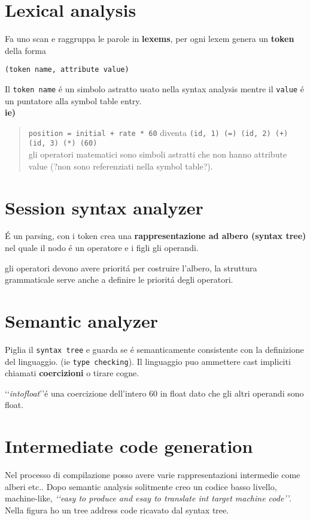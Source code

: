 \section{Lexical analysis}
Fa uno scan e raggruppa le parole in \textbf{lexems}, per ogni lexem genera un \textbf{token} della forma

\begin{center}
    \texttt{(token name, attribute value)} 
\end{center}

Il \texttt{token name} \'e un simbolo astratto usato nella syntax analysis
mentre il \texttt{value} \'e un puntatore alla symbol table entry.\\[5pt]

\textbf{ie)}
\begin{quote}
    \texttt{position = initial + rate * 60} diventa \texttt{(id, 1) (=) (id, 2) (+) (id, 3) (*) (60)}\\
    gli operatori matematici sono simboli astratti che non hanno attribute value (?non sono referenziati nella symbol table?).
\end{quote}


\section{Session syntax analyzer} 
\'E un parsing, con i token crea una \textbf{rappresentazione ad albero (syntax tree)} nel quale 
il nodo \'e un operatore e i figli gli operandi. 

gli operatori devono avere priorit\'a per costruire l'albero, la struttura grammaticale serve anche a 
definire le priorit\'a degli operatori.

\section{Semantic analyzer} 
Piglia il \texttt{syntax tree} e guarda se \'e semanticamente consistente con la definizione del linguaggio.
(ie \texttt{type checking}). Il linguaggio puo ammettere cast impliciti chiamati \textbf{coercizioni} o tirare cogne.

\lq\lq \textit{intofloat}\rq\rq \'e una coercizione dell'intero 60 in float dato che gli altri operandi sono float. 

\section{Intermediate code generation}
Nel processo di compilazione posso avere varie rappresentazioni intermedie come alberi etc..
Dopo semantic analysis solitmente creo un codice basso livello, machine-like, \textit{\lq\lq easy to 
produce and esay to translate int target machine code\rq\rq}. Nella figura ho un tree address code
ricavato dal syntax tree. 

